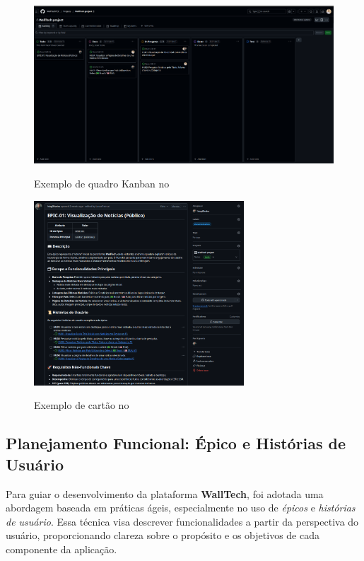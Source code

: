 \begin{figure}[H]
  \centering
  \caption{Exemplo de quadro Kanban no }
  \includegraphics[width=1.0\textwidth]{media/wall_tech_kanban.png}
  \label{fig:kanban-walltech}
\end{figure}

\begin{figure}[H]
  \centering
  \caption{Exemplo de cartão  no }
  \includegraphics[width=0.7\textwidth]{media/wall_tech_epic.png}
  \label{fig:kanban-userstories}
\end{figure}




\subsection{Planejamento Funcional: Épico e Histórias de Usuário}

Para guiar o desenvolvimento da plataforma \textbf{WallTech}, foi adotada uma abordagem baseada em práticas ágeis, especialmente no uso de \textit{épicos} e \textit{histórias de usuário}. Essa técnica visa descrever funcionalidades a partir da perspectiva do usuário, proporcionando clareza sobre o propósito e os objetivos de cada componente da aplicação.

